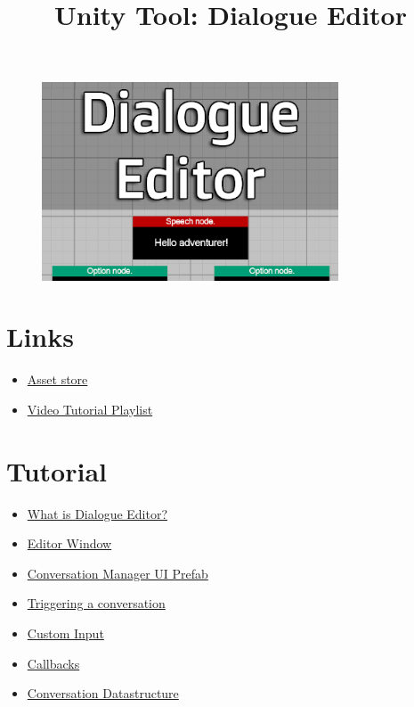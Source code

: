 \documentclass[a4paper,12pt]{article}
\begin{document}
\title{Unity Tool: Dialogue Editor\vspace{-50pt}}
\date{}
\maketitle

\begin{figure}[ht]
\centering
\includegraphics[width=250pt, keepaspectratio]{img/CardImage.png}
\end{figure}

\section{Links}
\begin{itemize}
\setlength\itemsep{1pt}
	\item \href{https://assetstore.unity.com/packages/tools/utilities/dialogue-editor-168329}{Asset store}
	\item \href{https://www.youtube.com/playlist?list=PLfRF6lnXtGqjrhzyQhidqMD-shMHGReXi}{Video Tutorial Playlist}
\end{itemize}


\section{Tutorial}
\begin{itemize}
\setlength\itemsep{1pt}
	\item \hyperlink{_whatis}{What is Dialogue Editor?}
	\item \hyperlink{_editorwindow}{Editor Window}
	\item \hyperlink{_conversationmanager}{Conversation Manager UI Prefab}
	\item \hyperlink{_triggering}{Triggering a conversation}
	\item \hyperlink{_custominput}{Custom Input}
	\item \hyperlink{_callbacks}{Callbacks}
	\item \hyperlink{_datastructure}{Conversation Datastructure}
\end{itemize}
\end{document}
